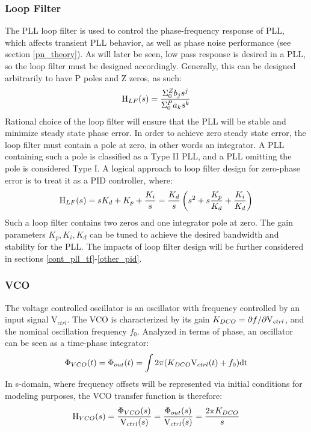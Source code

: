 		\subsubsection{Loop Filter}
			The PLL loop filter is used to control the phase-frequency response of PLL, which affects transient PLL behavior, as well as phase noise performance (see section \ref{pn_theory}). As will later be seen, low pass response is desired in a PLL, so the loop filter must be designed accordingly. Generally, this can be designed arbitrarily to have P poles and Z zeros, as such:
			\begin{equation}
				\textnormal{H}_{LF}(s) = \frac{\Sigma_0^Z b_js^j}{\Sigma_0^P a_ks^k}
			\end{equation}
			Rational choice of the loop filter will ensure that the PLL will be stable and minimize steady state phase error. In order to achieve zero steady state error, the loop filter must contain a pole at zero, in other words an integrator. A PLL containing such a pole is classified as a Type II PLL, and a PLL omitting the pole is considered Type I. A logical approach to loop filter design for zero-phase error is to treat it as a PID controller, where:
			\begin{equation}
				\textnormal{H}_{LF}(s) = sK_d + K_p + \frac{K_i}{s} = \frac{K_d}{s}\left(s^2 + s\frac{K_p}{K_d} + \frac{K_i}{K_d}\right)
			\end{equation}
			Such a loop filter contains two zeros and one integrator pole at zero. The gain parameters $K_p, K_i, K_d$ can be tuned to achieve the desired bandwidth and stability for the PLL. The impacts of loop filter design will be further considered in sections \ref{cont_pll_tf}-\ref{other_pid}.
			
		\subsubsection{VCO}
			The voltage controlled oscillator is an oscillator with frequency controlled by an input signal V$_{ctrl}$. The VCO is characterized by its gain $K_{DCO} = \partial f/\partial \textnormal{V}_{ctrl}$, and the nominal oscillation frequency $f_0$. Analyzed in terms of phase, an oscillator can be seen as a time-phase integrator:
			\begin{equation}
				\Phi_{VCO}(t) = \Phi_{out}(t) = \int2\pi(K_{DCO}\textnormal{V}_{ctrl}(t) + f_0)\mathrm{dt}
			\end{equation}
			In s-domain, where frequency offsets will be represented via initial conditions for modeling purposes, the VCO transfer function is therefore:
			\begin{equation}
				\mathrm{H}_{VCO}(s) = \frac{\Phi_{VCO}(s)}{\textnormal{V}_{ctrl}(s)} = \frac{\Phi_{out}(s)}{\textnormal{V}_{ctrl}(s)} = \frac{2\pi K_{DCO}}{s}
			\end{equation}

